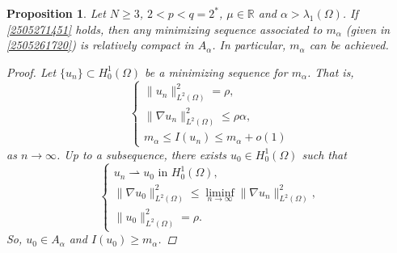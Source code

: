 \documentclass[10pt]{article}
\numberwithin{equation}{section}
\newtheorem{proposition}[theorem]{Proposition}
\numberwithin{equation}{section}
\begin{document}
\begin{proposition}\label{P050601}
Let $N\geq 3$, $2<p<q=2^*$, $\mu\in \mathbb{R}$ and $\alpha>\lambda_{1}(\Omega)$. If \eqref{2505271451} holds, then any minimizing sequence associated to $m_{\alpha}$ {\rm(}given in \eqref{2505261720}{\rm)} is relatively compact in $A_{\alpha}$. In particular, $m_{\alpha}$ can be achieved.
\begin{proof}
Let $\{u_n\}\subset H^1_0(\Omega)$ be a minimizing sequence for $m_{\alpha}$. That is,
\begin{equation}\label{040503}
\begin{cases}
\|u_n\|^{2}_{L^{2}(\Omega)}=\rho, \\
\|\nabla u_n\|^{2}_{L^{2}(\Omega)}\leq\rho\alpha, \\
m_{\alpha}\leq I(u_n)\leq m_{\alpha}+o(1)
\end{cases}
\end{equation}
as $n \rightarrow \infty$. Up to a subsequence, there exists $u_0\in H^1_0(\Omega)$ such that
\begin{equation*}
\begin{cases}
u_n\rightharpoonup u_0 \text{ in } H^1_0(\Omega), \\
\|\nabla u_0\|^{2}_{L^{2}(\Omega)}\leq\liminf\limits_{n\rightarrow \infty}\|\nabla u_n\|^{2}_{L^{2}(\Omega)}, \\
\|u_0\|^{2}_{L^{2}(\Omega)}=\rho.
\end{cases}
\end{equation*}
So, $u_0\in A_{\alpha}$ and $I(u_0)\geq m_{\alpha}$.


\end{proof}
\end{proposition}
\end{document}
